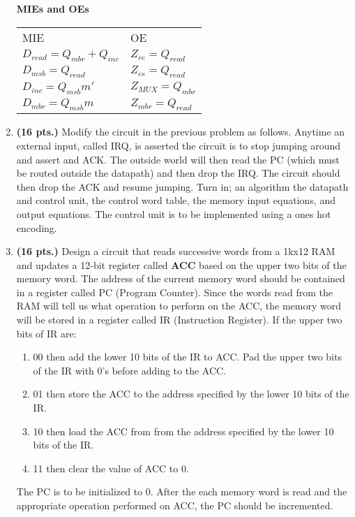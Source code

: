 \begin{enumerate}
\begin{onlysolution}
{\textbf{ MIEs and OEs}

\begin{tabular}{ll}
MIE					&	OE			\\
$D_{read}= Q_{mbr}+Q_{inc}$		&  $Z_{re} = Q_{read}$		\\
$D_{msb} = Q_{read}$			&  $Z_{cs} = Q_{read}$		\\
$D_{inc}= Q_{msb} m'$			&  $Z_{MUX} = Q_{mbr}$		\\
$D_{mbr}= Q_{msb} m$			&  $Z_{mbr} = Q_{read}$		\\
\end{tabular}

} \end{onlysolution} 


\item \textbf{ (16 pts.)}
Modify the circuit in the previous problem as follows.  Anytime
an external input, called IRQ, is asserted the circuit is to stop
jumping around and assert and ACK.  The outside world will then read
the PC (which must be routed outside the datapath) and then drop the 
IRQ.  The circuit should then drop the ACK and resume jumping.
Turn in; an algorithm
the datapath and control unit,
the control word table,
the memory input equations, and
output equations.  
The control unit is to be implemented using a ones hot encoding.

\item  \textbf{ (16 pts.)} Design a circuit that reads successive words from 
a 1kx12 RAM and
updates a 12-bit register called \textbf{ ACC} based on the upper two bits of the 
memory word.  The address of the current memory word should be contained
in a register called PC (Program Counter).  Since the words read from the
RAM will tell us what operation to perform on the ACC, the memory word will
be stored in a register called IR (Instruction Register).  If the upper
two bits of IR are:
\begin{enumerate}
\item  00 then add the lower 10 bits of the IR to ACC.  Pad the upper two
	bits of the IR with 0's before adding to the ACC.
\item  01 then store the ACC to the address specified by the 
	lower 10 bits of the IR.
\item  10 then load the ACC from from the address specified by the lower 
	10 bits of the IR.
\item  11 then clear the value of ACC to 0.
\end{enumerate}

The PC is to be initialized to 0.  After the each memory word is read
and the appropriate operation performed on ACC, the PC should be
incremented.


\end{enumerate}
